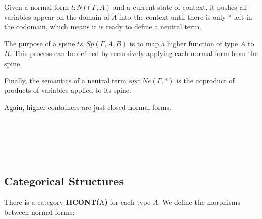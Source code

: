 Given a normal form $t : Nf(\Gamma,A)$ and a current state of context, it pushes all variables appear on the domain of $A$ into the context until there is only $*$ left in the codomain, which means it is ready to define a neutral term. 

The purpose of a spine $ts : Sp(\Gamma,A,B)$ is to map a higher function of type $A$ to $B$. This process can be defined by recursively applying each normal form from the spine.

Finally, the semantics of a neutral term $spr : Ne(\Gamma,*)$ is the coproduct of products of variables applied to its spine.

Again, higher containers are just closed normal forms.

\begin{code}%
\>[0]\AgdaSpace{}%
\AgdaSymbol{:}\AgdaSpace{}%
\AgdaSpace{}%
\AgdaSpace{}%
\AgdaSpace{}%
\AgdaSpace{}%
\AgdaSpace{}%
\<%
\\
\>[0]\AgdaSpace{}%
\AgdaSpace{}%
\AgdaSpace{}%
\AgdaSymbol{=}\AgdaSpace{}%
\AgdaSpace{}%
\AgdaSpace{}%
\AgdaSpace{}%
\AgdaSymbol{(}\AgdaSpace{}%
\AgdaSymbol{)}\<%
\\
%
\\[\AgdaEmptyExtraSkip]%
\>[0]\AgdaSpace{}%
\AgdaSymbol{:}\AgdaSpace{}%
\AgdaSymbol{(}\AgdaSpace{}%
\AgdaSpace{}%
\AgdaSymbol{)}\AgdaSpace{}%
\AgdaSpace{}%
\AgdaSpace{}%
\AgdaSpace{}%
\<%
\\
\>[0]\AgdaSpace{}%
\AgdaSymbol{=}\AgdaSpace{}%
\AgdaSpace{}%
\AgdaSpace{}%
\<%
\end{code}

\subsection{Categorical Structures}

There is a category \textbf{HCONT(}A\textbf{)} for each type $A$. We define the morphisms between normal forms:

